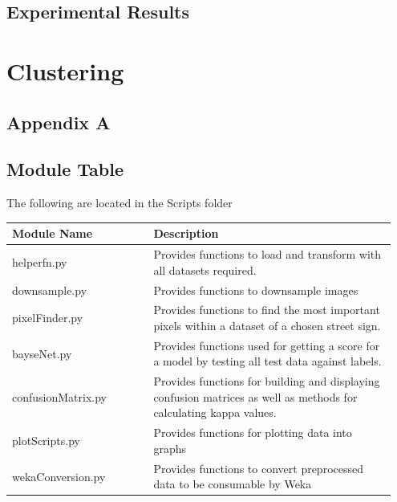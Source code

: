 \documentclass[11pt]{article}
\begin{document}
\subsection{Experimental Results}


\pagebreak

\section{Clustering}

\pagebreak
\appendix
\appendixpage
\addappheadtotoc
\begin{appendices}
\section{Appendix A}
\subsection{Module Table}\label{tab:moduleTable}
The following are located in the Scripts folder
\begin{table}[ht]
    \centering
    \begin{tabular}{p{0.35\linewidth} | p{0.6\linewidth}} 
      \textbf{Module Name}  & \textbf{Description} \\ \hline
      helperfn.py & Provides functions to load and transform with all datasets required. \\ \hline
      downsample.py & Provides functions to downsample images  \\ \hline
      pixelFinder.py & Provides functions to find the most important pixels within a dataset of a chosen street sign. \\ \hline
      bayseNet.py & Provides functions used for getting a score for a model by testing all test data against labels. \\ \hline
      confusionMatrix.py & Provides functions for building and displaying confusion matrices as well as methods for calculating kappa values. \\ \hline
      plotScripts.py & Provides functions for plotting data into graphs \\ \hline
      wekaConversion.py & Provides functions to convert preprocessed data to be consumable by Weka
    \end{tabular}
\end{table}

\newpage

\end{appendices}
\end{document}
